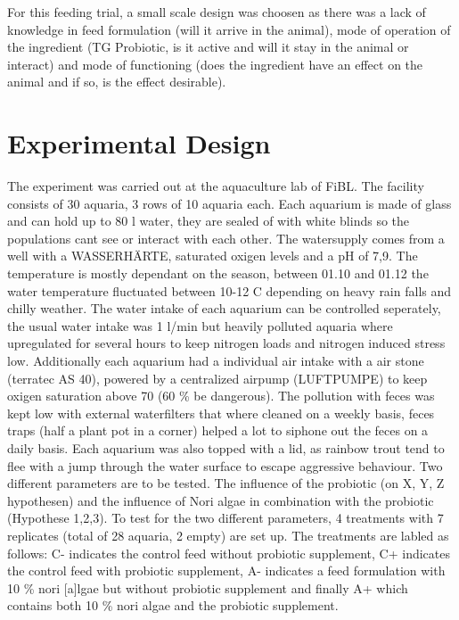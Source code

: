 For this feeding trial, a small scale design was choosen as there was a lack of knowledge in feed formulation (will it arrive in the animal), mode of operation of the ingredient (TG Probiotic, is it active and will it stay in the animal or interact) and mode of functioning (does the ingredient have an effect on the animal and if so, is the effect desirable).  

\section{Experimental Design}

The experiment was carried out at the aquaculture lab of FiBL. The facility consists of 30 aquaria, 3 rows of 10 aquaria each. Each aquarium is made of glass and can hold up to 80 l water, they are sealed of with white blinds so the populations cant see or interact with each other. The watersupply comes from a well with a WASSERHÄRTE, saturated oxigen levels and a pH of 7,9. The temperature is mostly dependant on the season, between 01.10 and 01.12 the water temperature fluctuated between 10-12  C depending on heavy rain falls and chilly weather. The water intake of each aquarium can be controlled  seperately, the usual water intake was  1 l/min but heavily polluted aquaria where upregulated for several hours to keep nitrogen loads and nitrogen induced stress low. Additionally each aquarium had a individual air intake with a air stone (terratec AS 40), powered by a centralized airpump (LUFTPUMPE) to keep oxigen saturation above 70  (60 \% be dangerous). The pollution with feces was kept low with external waterfilters that where cleaned on a weekly basis, feces traps (half a plant pot in a corner) helped a lot to siphone out the feces on a daily basis. Each aquarium was also topped with a lid, as rainbow trout tend to flee with a jump through the water surface to escape aggressive behaviour.
Two different parameters are to be tested. The influence of the probiotic (on X, Y, Z hypothesen) and the influence of Nori algae in combination with the probiotic (Hypothese 1,2,3). To test for the two different  parameters, 4 treatments with 7 replicates (total of 28 aquaria, 2 empty) are set up.
The treatments are labled as follows: C- indicates the control feed without
probiotic supplement, C+ indicates the control feed with probiotic supplement,
A- indicates a feed formulation with 10 \% nori [a]lgae but without probiotic 
supplement and finally A+ which contains both 10 \% nori algae and the probiotic
supplement. 

